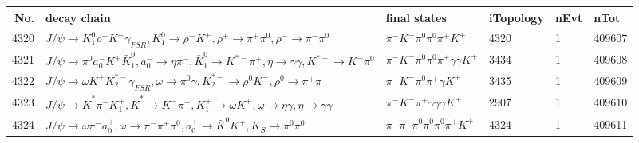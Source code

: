 \begin{table}[htbp] 
\begin{center}
\begin{small}
\begin{tabular}{rlllll}\hline\hline
 No. & decay chain & final states &  iTopology & nEvt & nTot \\\hline
4320&$J/\psi       \rightarrow K_1^{0}        \rho^{+}      K^{-}          \gamma_{FSR} , K_1^{0}         \rightarrow \rho^{-}      K^{+}          , \rho^{+}       \rightarrow \pi^{+}        \pi^{0}        , \rho^{-}       \rightarrow \pi^{-}        \pi^{0}        $&$\pi^{-}        K^{-}          \pi^{0}        \pi^{0}        \pi^{+}        K^{+}          $& 4320&    1&409607\\
4321&$J/\psi       \rightarrow \pi^{0}        a_{0}^{-}      K^{+}          \bar{K}_1^{0} , a_{0}^{-}       \rightarrow \eta          \pi^{-}        , \bar{K}_1^{0}  \rightarrow K^{*-}         \pi^{+}        , \eta           \rightarrow \gamma       \gamma       , K^{*-}          \rightarrow K^{-}          \pi^{0}        $&$\pi^{-}        K^{-}          \pi^{0}        \pi^{0}        \pi^{+}        \gamma       \gamma       K^{+}          $& 3434&    1&409608\\
4322&$J/\psi       \rightarrow \omega         K^{+}          K_2^{*-}       \gamma_{FSR} , \omega          \rightarrow \pi^{0}        \gamma       , K_2^{*-}        \rightarrow \rho^{0}      K^{-}          , \rho^{0}       \rightarrow \pi^{+}        \pi^{-}        $&$\pi^{-}        K^{-}          \pi^{0}        \pi^{+}        \gamma       K^{+}          $& 3435&    1&409609\\
4323&$J/\psi       \rightarrow \bar{K}^{*}   \pi^{-}        K_1^{+}        , \bar{K}^{*}    \rightarrow K^{-}          \pi^{+}        , K_1^{+}         \rightarrow \omega         K^{+}          , \omega          \rightarrow \eta          \gamma       , \eta           \rightarrow \gamma       \gamma       $&$\pi^{-}        K^{-}          \pi^{+}        \gamma       \gamma       \gamma       K^{+}          $& 2907&    1&409610\\
4324&$J/\psi       \rightarrow \omega         \pi^{-}        a_{0}^{+}      , \omega          \rightarrow \pi^{-}        \pi^{+}        \pi^{0}        , a_{0}^{+}       \rightarrow \bar{K}^{0}   K^{+}          , K_{S}           \rightarrow \pi^{0}        \pi^{0}        $&$\pi^{-}        \pi^{-}        \pi^{0}        \pi^{0}        \pi^{0}        \pi^{+}        K^{+}          $& 4324&    1&409611\\

\end{tabular}
\end{small}
\end{center}
\end{table}
